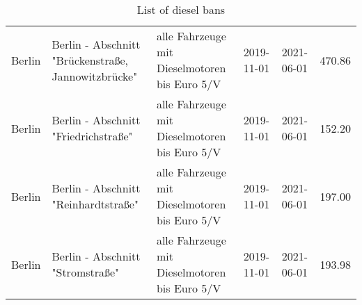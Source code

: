 \begin{table}[ht]
\begin{tabular}{lp{1.55in}p{1in}lll}
  Berlin & Berlin - Abschnitt "Brückenstraße, Jannowitzbrücke" & alle Fahrzeuge mit Dieselmotoren bis Euro 5/V & 2019-11-01 & 2021-06-01 & 470.86 \\ 
  Berlin & Berlin - Abschnitt "Friedrichstraße" & alle Fahrzeuge mit Dieselmotoren bis Euro 5/V & 2019-11-01 & 2021-06-01 & 152.20 \\ 
  Berlin & Berlin - Abschnitt "Reinhardtstraße" & alle Fahrzeuge mit Dieselmotoren bis Euro 5/V & 2019-11-01 & 2021-06-01 & 197.00 \\ 
  Berlin & Berlin - Abschnitt "Stromstraße" & alle Fahrzeuge mit Dieselmotoren bis Euro 5/V & 2019-11-01 & 2021-06-01 & 193.98 \\ 
   \bottomrule
\end{tabular}
\endgroup
\caption{List of diesel bans} 
\end{table}
